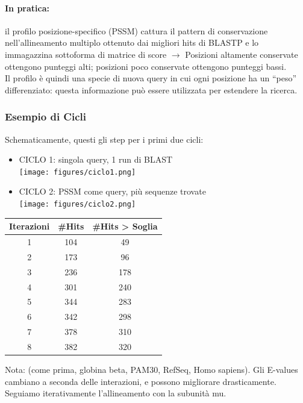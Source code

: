 \documentclass{article}
\begin{document}
\paragraph{In pratica:} il profilo posizione-specifico (PSSM) cattura il
pattern di conservazione nell'allineamento multiplo ottenuto
dai migliori hits di BLASTP e lo immagazzina sottoforma di
matrice di score $\rightarrow$ Posizioni altamente conservate ottengono punteggi alti;
posizioni poco conservate ottengono punteggi bassi.\\
Il profilo è quindi una specie di nuova query in cui ogni
posizione ha un “peso” differenziato: questa informazione
può essere utilizzata per estendere la ricerca.
\subsubsection{Esempio di Cicli}
Schematicamente, questi gli step per i primi due cicli:
\begin{itemize}
    \item CICLO 1: singola query, 1 run di BLAST\\\texttt{[image: figures/ciclo1.png]}
    \item CICLO 2: PSSM come query, più sequenze trovate\\\texttt{[image: figures/ciclo2.png]}
\end{itemize}
\begin{center}
    \begin{tabular}{ccc}
        \toprule
        \textbf{Iterazioni} & \textbf{\#Hits} & \textbf{\#Hits > Soglia}\\
        \midrule
        1 & 104 & 49\\
        2 & 173 & 96\\
        3 & 236 & 178\\
        4 & 301 & 240\\
        5 & 344 & 283\\
        6 & 342 & 298\\
        7 & 378 & 310\\
        8 & 382 & 320
    \end{tabular}
\end{center}
Nota: (come prima, globina beta, PAM30, RefSeq, Homo
sapiens). Gli E-values cambiano a seconda delle
interazioni, e possono migliorare drasticamente. Seguiamo iterativamente l'allineamento con la subunità mu.
\end{document}
